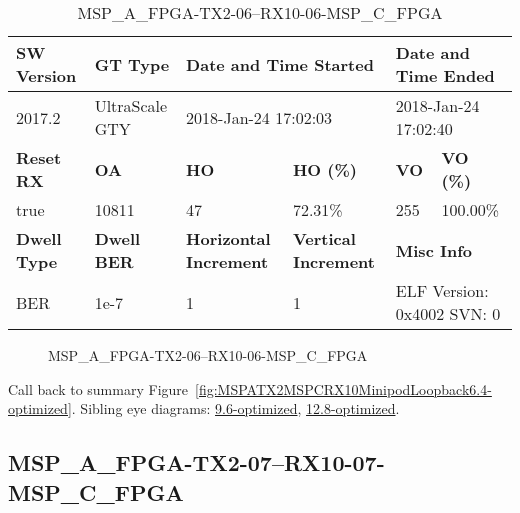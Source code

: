 \begin{table}[h]
\centering
\caption{MSP\_A\_FPGA-TX2-06--RX10-06-MSP\_C\_FPGA}
\label{tab:MSPAFPGATX206RX1006MSPCFPGA6.4-optimized}
\begin{tabular}{@{}|l|l|l|l|l|l|@{}}
\toprule
\textbf{SW Version}                & \textbf{GT Type}   & \multicolumn{2}{l|}{\textbf{Date and Time Started}}            & \multicolumn{2}{l|}{\textbf{Date and Time Ended}}        \\ \midrule
2017.2                       & UltraScale GTY          & \multicolumn{2}{l|}{2018-Jan-24 17:02:03}                   & \multicolumn{2}{l|}{2018-Jan-24 17:02:40}               \\ \midrule
\textbf{Reset RX}                  & \textbf{OA} & \textbf{HO}   & \textbf{HO (\%)} & \textbf{VO} & \textbf{VO (\%)} \\ \midrule
true & 10811        & 47          & 72.31\%        & 255        & 100.00\%       \\ \midrule
\textbf{Dwell Type}                & \textbf{Dwell BER} & \textbf{Horizontal Increment} & \textbf{Vertical Increment}    & \multicolumn{2}{l|}{\textbf{Misc Info}}                  \\ \midrule
BER                            & 1e-7        & 1        & 1           & \multicolumn{2}{l|}{ELF Version: 0x4002 SVN: 0}                         \\ \bottomrule
\end{tabular}
\end{table}

\begin{figure}[h]
\caption{MSP\_A\_FPGA-TX2-06--RX10-06-MSP\_C\_FPGA} \label{fig:MSPAFPGATX206RX1006MSPCFPGA6.4-optimized}
\end{figure}

Call back to summary Figure~\ref{fig:MSPATX2MSPCRX10MinipodLoopback6.4-optimized}.
Sibling eye diagrams: \hyperref[sec:MSPAFPGATX206RX1006MSPCFPGA9.6-optimized]{9.6-optimized}, \hyperref[sec:MSPAFPGATX206RX1006MSPCFPGA12.8-optimized]{12.8-optimized}.

\clearpage
\newpage


\subsection{MSP\_A\_FPGA-TX2-07--RX10-07-MSP\_C\_FPGA}\label{sec:MSPAFPGATX207RX1007MSPCFPGA6.4-optimized}

